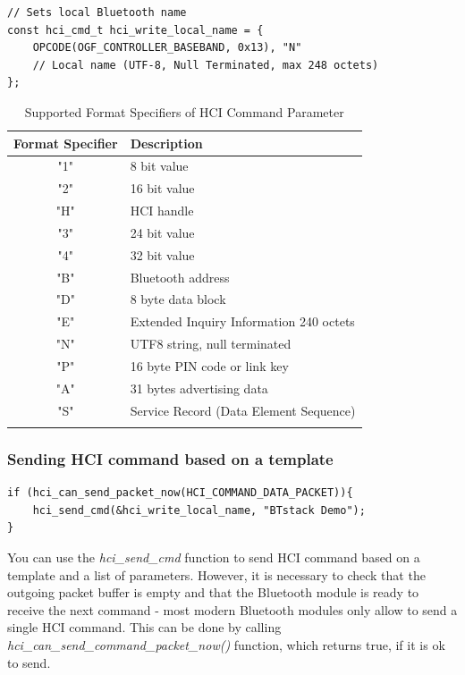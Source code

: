 \begin{lstlisting}[caption= Example of HCI command template., label=HCIcmdExample]
// Sets local Bluetooth name
const hci_cmd_t hci_write_local_name = {
    OPCODE(OGF_CONTROLLER_BASEBAND, 0x13), "N"
    // Local name (UTF-8, Null Terminated, max 248 octets)
};
\end{lstlisting}

\begin{table}\centering
\caption{Supported Format Specifiers of HCI Command Parameter}
\begin{tabular}{cl}\toprule
Format Specifier & Description\\ 
\midrule
"1" & 8 bit value \\
"2" & 16 bit value \\
"H" & HCI handle \\
"3" & 24 bit value \\
"4" & 32 bit value \\
"B" & Bluetooth address \\
"D" & 8 byte data block \\
"E" & Extended Inquiry Information 240 octets \\
"N" & UTF8 string, null terminated \\
"P" & 16 byte PIN code or link key \\
"A" & 31 bytes advertising data \\
"S" & Service Record (Data Element Sequence)\\
\bottomrule
\label{table:hciformat}
\end{tabular}
\end{table}

\subsubsection{Sending  HCI command based on a template}

\begin{lstlisting}[caption= Send hci\_write\_local\_name command that takes a string as a parameter., label=HCIcmdExampleLocalName]
if (hci_can_send_packet_now(HCI_COMMAND_DATA_PACKET)){
    hci_send_cmd(&hci_write_local_name, "BTstack Demo");
}  
\end{lstlisting}

You can use the \emph{hci\_send\_cmd} function to send HCI command based on a template and a list of parameters. However, it is necessary to check that the outgoing packet buffer is empty and that the Bluetooth module is ready to receive the next command - most modern Bluetooth modules only allow  to send a single HCI command. 
This can be done by calling \emph{hci\_can\_send\_command\_packet\_now()} function, which returns true, if it is ok to send.

